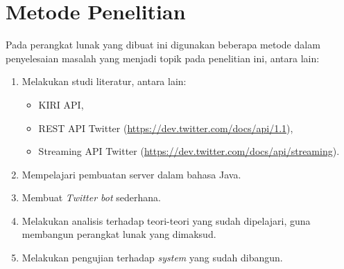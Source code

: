 \section{Metode Penelitian}
Pada perangkat lunak yang dibuat ini digunakan beberapa metode dalam penyelesaian masalah yang menjadi topik pada penelitian ini, antara lain:
\begin{enumerate}
	\item Melakukan studi literatur, antara lain:
	\begin{itemize}
		\item KIRI API,
		\item REST API Twitter (\url{https://dev.twitter.com/docs/api/1.1}),
		\item Streaming API Twitter (\url{https://dev.twitter.com/docs/api/streaming}).
	\end{itemize}
	\item Mempelajari pembuatan server dalam bahasa Java.
	\item Membuat \textit{Twitter bot} sederhana.
	\item Melakukan analisis terhadap teori-teori yang sudah dipelajari, guna membangun perangkat lunak yang dimaksud.
	\item Melakukan pengujian terhadap \textit{system} yang sudah dibangun.
\end{enumerate}
